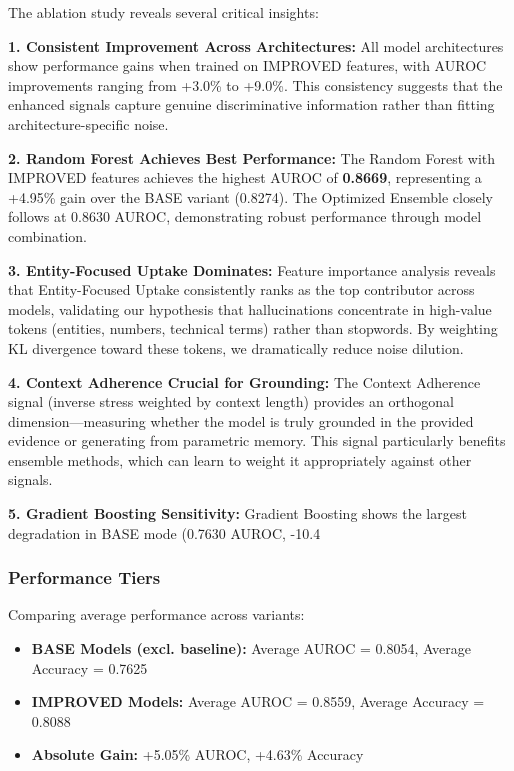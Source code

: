 \documentclass[11pt,letterpaper]{article}
\begin{document}
The ablation study reveals several critical insights:

\noindent\textbf{1. Consistent Improvement Across Architectures:} All model architectures show performance gains when trained on IMPROVED features, with AUROC improvements ranging from +3.0\% to +9.0\%. This consistency suggests that the enhanced signals capture genuine discriminative information rather than fitting architecture-specific noise.

\noindent\textbf{2. Random Forest Achieves Best Performance:} The Random Forest with IMPROVED features achieves the highest AUROC of \textbf{0.8669}, representing a +4.95\% gain over the BASE variant (0.8274). The Optimized Ensemble closely follows at 0.8630 AUROC, demonstrating robust performance through model combination.

\noindent\textbf{3. Entity-Focused Uptake Dominates:} Feature importance analysis reveals that Entity-Focused Uptake consistently ranks as the top contributor across models, validating our hypothesis that hallucinations concentrate in high-value tokens (entities, numbers, technical terms) rather than stopwords. By weighting KL divergence toward these tokens, we dramatically reduce noise dilution.

\noindent\textbf{4. Context Adherence Crucial for Grounding:} The Context Adherence signal (inverse stress weighted by context length) provides an orthogonal dimension—measuring whether the model is truly grounded in the provided evidence or generating from parametric memory. This signal particularly benefits ensemble methods, which can learn to weight it appropriately against other signals.

\noindent\textbf{5. Gradient Boosting Sensitivity:} Gradient Boosting shows the largest degradation in BASE mode (0.7630 AUROC, -10.4%

\subsubsection{Performance Tiers}

Comparing average performance across variants:
\begin{itemize}[leftmargin=*,itemsep=0pt]
    \item \textbf{BASE Models (excl. baseline):} Average AUROC = 0.8054, Average Accuracy = 0.7625
    \item \textbf{IMPROVED Models:} Average AUROC = 0.8559, Average Accuracy = 0.8088
    \item \textbf{Absolute Gain:} +5.05\% AUROC, +4.63\% Accuracy
\end{itemize}
\end{document}
